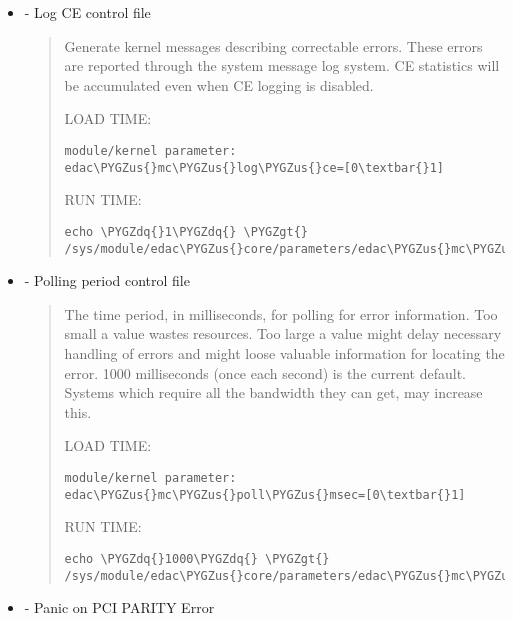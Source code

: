\documentclass[a4paper,8pt,english]{sphinxmanual}
\def\PYGZus{\char`\_}
\def\PYGZgt{\char`\>}
\def\PYGZdq{\char`\"}
\begin{document}
\begin{itemize}
\item {} 
 - Log CE control file
\begin{quote}

Generate kernel messages describing correctable errors.  These
errors are reported through the system message log system.
CE statistics will be accumulated even when CE logging is disabled.

LOAD TIME:

\begin{Verbatim}[commandchars=\\\{\}]
module/kernel parameter: edac\PYGZus{}mc\PYGZus{}log\PYGZus{}ce=[0\textbar{}1]
\end{Verbatim}

RUN TIME:

\begin{Verbatim}[commandchars=\\\{\}]
echo \PYGZdq{}1\PYGZdq{} \PYGZgt{} /sys/module/edac\PYGZus{}core/parameters/edac\PYGZus{}mc\PYGZus{}log\PYGZus{}ce
\end{Verbatim}
\end{quote}

\item {} 
 - Polling period control file
\begin{quote}

The time period, in milliseconds, for polling for error information.
Too small a value wastes resources.  Too large a value might delay
necessary handling of errors and might loose valuable information for
locating the error.  1000 milliseconds (once each second) is the current
default. Systems which require all the bandwidth they can get, may
increase this.

LOAD TIME:

\begin{Verbatim}[commandchars=\\\{\}]
module/kernel parameter: edac\PYGZus{}mc\PYGZus{}poll\PYGZus{}msec=[0\textbar{}1]
\end{Verbatim}

RUN TIME:

\begin{Verbatim}[commandchars=\\\{\}]
echo \PYGZdq{}1000\PYGZdq{} \PYGZgt{} /sys/module/edac\PYGZus{}core/parameters/edac\PYGZus{}mc\PYGZus{}poll\PYGZus{}msec
\end{Verbatim}
\end{quote}

\item {} 
 - Panic on PCI PARITY Error
\begin{quote}


\end{quote}
\end{itemize}
\end{document}
